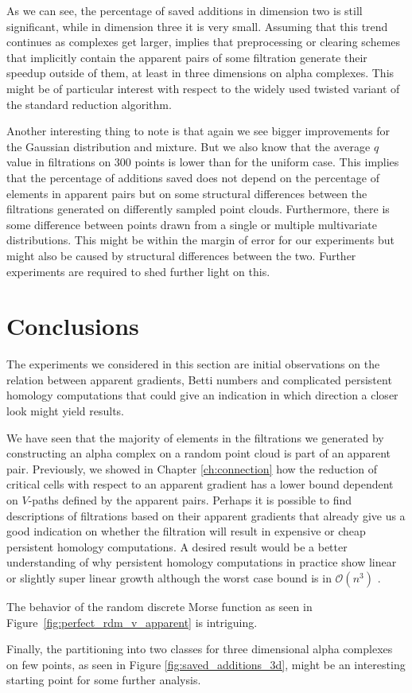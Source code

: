 As we can see, the percentage of saved additions in dimension two is still significant, while in dimension three it is very small. Assuming that this trend continues as complexes get larger, implies that preprocessing or clearing schemes that implicitly contain the apparent pairs of some filtration generate their speedup outside of them, at least in three dimensions on alpha complexes. This might be of particular interest with respect to the widely used twisted variant of the standard reduction algorithm.

Another interesting thing to note is that again we see bigger improvements for the Gaussian distribution and mixture. But we also know that the average $q$ value in filtrations on $300$ points is lower than for the uniform case. This implies that the percentage of additions saved does not depend on the percentage of elements in apparent pairs but on some structural differences between the filtrations generated on differently sampled point clouds. Furthermore, there is some difference between points drawn from a single or multiple multivariate distributions. This might be within the margin of error for our experiments but might also be caused by structural differences between the two. Further experiments are required to shed further light on this.

\section{Conclusions}
The experiments we considered in this section are initial observations on the relation between apparent gradients, Betti numbers and complicated persistent homology computations that could give an indication in which direction a closer look might yield results.
 
We have seen that the majority of elements in the filtrations we generated by constructing an alpha complex on a random point cloud is part of an apparent pair. Previously, we showed in Chapter \ref{ch:connection} how the reduction of critical cells with respect to an apparent gradient has a lower bound dependent on $V$-paths defined by the apparent pairs. Perhaps it is possible to find descriptions of filtrations based on their apparent gradients that already give us a good indication on whether the filtration will result in expensive or cheap persistent homology computations. A desired result would be a better understanding of why persistent homology computations in practice show linear or slightly super linear growth although the worst case bound is in $\mathcal{O}(n^3)$ \cite{pershom}. 

The behavior of the random discrete Morse function as seen in Figure~\ref{fig:perfect_rdm_v_apparent} is intriguing.

Finally, the partitioning into two classes for three dimensional alpha complexes on few points, as seen in Figure \ref{fig:saved_additions_3d}, might be an interesting starting point for some further analysis. 

